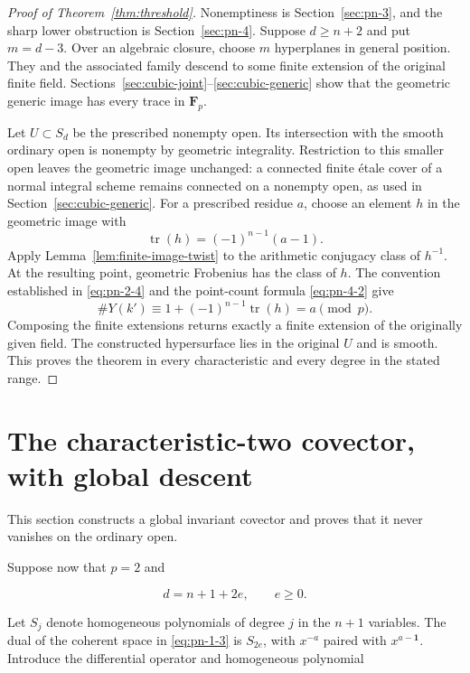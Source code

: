 \documentclass[11pt]{article}
\begin{document}
\begin{proof}[Proof of Theorem~\ref{thm:threshold}]
Nonemptiness is Section~\ref{sec:pn-3}, and the sharp lower obstruction is Section~\ref{sec:pn-4}. Suppose $d\ge n+2$ and put $m=d-3$. Over an algebraic closure, choose $m$ hyperplanes in general position. They and the associated family descend to some finite extension of the original finite field. Sections~\ref{sec:cubic-joint}--\ref{sec:cubic-generic} show that the geometric generic image has every trace in $\mathbf F_p$.

Let $U\subset S_d$ be the prescribed nonempty open. Its intersection with the smooth ordinary open is nonempty by geometric integrality. Restriction to this smaller open leaves the geometric image unchanged: a connected finite \'etale cover of a normal integral scheme remains connected on a nonempty open, as used in Section~\ref{sec:cubic-generic}. For a prescribed residue $a$, choose an element $h$ in the geometric image with
\[
\operatorname{tr}(h)=(-1)^{n-1}(a-1).
\]
Apply Lemma~\ref{lem:finite-image-twist} to the arithmetic conjugacy class of $h^{-1}$. At the resulting point, geometric Frobenius has the class of $h$. The convention established in \eqref{eq:pn-2-4} and the point-count formula \eqref{eq:pn-4-2} give
\[
\#Y(k')\equiv1+(-1)^{n-1}\operatorname{tr}(h)=a\pmod p.
\]
Composing the finite extensions returns exactly a finite extension of the originally given field. The constructed hypersurface lies in the original $U$ and is smooth. This proves the theorem in every characteristic and every degree in the stated range.
\end{proof}

\section{The characteristic-two covector, with global descent}\label{sec:pn-6}

This section constructs a global invariant covector and proves that it never vanishes on the ordinary open.

Suppose now that \(p=2\) and

\begin{equation}
                         d=n+1+2e,\qquad e\geq0.
\end{equation}

Let \(S_j\) denote homogeneous polynomials of degree \(j\) in the
\(n+1\) variables. The dual of the coherent space in \eqref{eq:pn-1-3} is
\(S_{2e}\), with \(x^{-a}\) paired with \(x^{a-\mathbf1}\).
Introduce the differential operator and homogeneous polynomial
\end{document}
